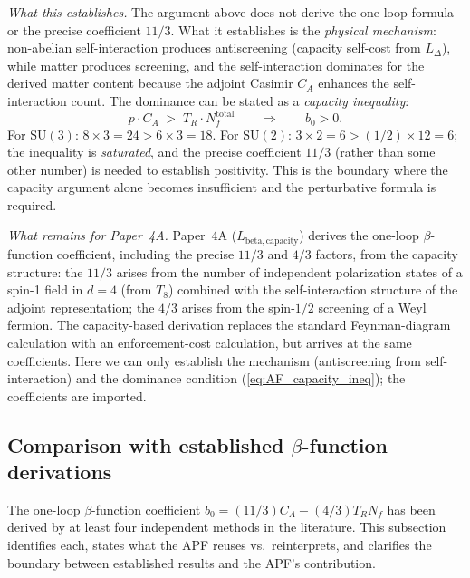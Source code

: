 \documentclass[11pt,a4paper]{article}
\theoremstyle{definition}
\newcommand{\SU}{\mathrm{SU}}
\begin{document}
\noindent\textit{What this establishes.}\quad
The argument above does not derive the one-loop formula or the
precise coefficient $11/3$.  What it establishes is the \emph{physical
mechanism}: non-abelian self-interaction produces antiscreening
(capacity self-cost from $L_\Delta$), while matter produces screening,
and the self-interaction dominates for the derived matter content
because the adjoint Casimir $C_A$ enhances the self-interaction
count.  The dominance can be stated as a \emph{capacity inequality}:
\begin{equation}\label{eq:AF_capacity_ineq}
  p \cdot C_A \;>\; T_R \cdot N_f^{\mathrm{total}}
  \qquad\Longrightarrow\qquad b_0 > 0.
\end{equation}
For $\SU(3)$: $8 \times 3 = 24 > 6 \times 3 = 18$.  For $\SU(2)$:
$3 \times 2 = 6 > (1/2) \times 12 = 6$; the inequality is
\emph{saturated}, and the precise coefficient $11/3$ (rather than
some other number) is needed to establish positivity.  This is
the boundary where the capacity argument alone becomes insufficient
and the perturbative formula is required.

\smallskip\noindent\textit{What remains for Paper~4A.}\quad
Paper~4A ($L_{\mathrm{beta,capacity}}$) derives the one-loop
$\beta$-function coefficient, including the precise $11/3$ and $4/3$
factors, from the capacity structure: the $11/3$ arises from the
number of independent polarization states of a spin-1 field in $d = 4$
(from $T_8$) combined with the self-interaction structure of the
adjoint representation; the $4/3$ arises from the spin-$1/2$ screening
of a Weyl fermion.  The capacity-based derivation replaces the
standard Feynman-diagram calculation with an enforcement-cost
calculation, but arrives at the same coefficients.  Here we can only
establish the mechanism (antiscreening from self-interaction) and the
dominance condition (\ref{eq:AF_capacity_ineq}); the coefficients are
imported.


\subsection{Comparison with established $\beta$-function derivations}
\label{sec:AF_comparison}

The one-loop $\beta$-function coefficient
$b_0 = (11/3)C_A - (4/3)T_R N_f$ has been derived by at least four
independent methods in the literature.  This subsection identifies each,
states what the APF reuses vs.\ reinterprets, and clarifies the
boundary between established results and the APF's contribution.
\end{document}
